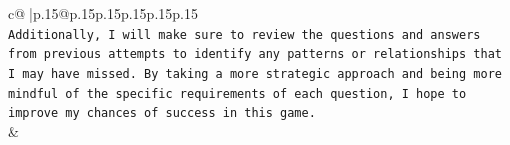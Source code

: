 \documentclass{article}
\begin{document}
{\begin{supertabular}{c@{$\;$}|p{.15\linewidth}@{}p{.15\linewidth}p{.15\linewidth}p{.15\linewidth}p{.15\linewidth}p{.15\linewidth}}
{{{\\ 
\texttt{Additionally, I will make sure to review the questions and answers from previous attempts to identify any patterns or relationships that I may have missed. By taking a more strategic approach and being more mindful of the specific requirements of each question, I hope to improve my chances of success in this game.} \\
            }
        }
    }
    & \\ \\

\end{supertabular}
}
\end{document}

